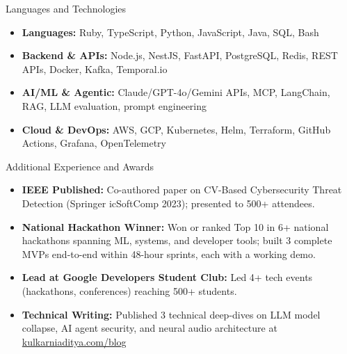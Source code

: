 \documentclass[]{mcdowellcv}
\begin{document}
\begin{cvsection}{Languages and Technologies}
  \begin{cvsubsection}{}{}{}
    \begin{itemize}
      \item \textbf{Languages:} Ruby, TypeScript, Python, JavaScript, Java, SQL, Bash
      \item \textbf{Backend \& APIs:} Node.js, NestJS, FastAPI, PostgreSQL, Redis, REST APIs, Docker, Kafka, Temporal.io
      \item \textbf{AI/ML \& Agentic:} Claude/GPT-4o/Gemini APIs, MCP, LangChain, RAG, LLM evaluation, prompt engineering
      \item \textbf{Cloud \& DevOps:} AWS, GCP, Kubernetes, Helm, Terraform, GitHub Actions, Grafana, OpenTelemetry
    \end{itemize}
  \end{cvsubsection}
\end{cvsection}

\begin{cvsection}{Additional Experience and Awards}
  \begin{cvsubsection}{}{}{}
    \begin{itemize}
      \item \textbf{IEEE Published:} Co-authored paper on CV-Based Cybersecurity Threat Detection (Springer icSoftComp 2023); presented to 500+ attendees.
      \item \textbf{National Hackathon Winner:} Won or ranked Top 10 in 6+ national hackathons spanning ML, systems, and developer tools; built 3 complete MVPs end-to-end within 48-hour sprints, each with a working demo.
      \item \textbf{Lead at Google Developers Student Club:} Led 4+ tech events (hackathons, conferences) reaching 500+ students.
      \item \textbf{Technical Writing:} Published 3 technical deep-dives on LLM model collapse, AI agent security, and neural audio architecture at \href{https://www.kulkarniaditya.com/blog}{kulkarniaditya.com/blog}
    \end{itemize}
  \end{cvsubsection}
\end{cvsection}
\end{document}

